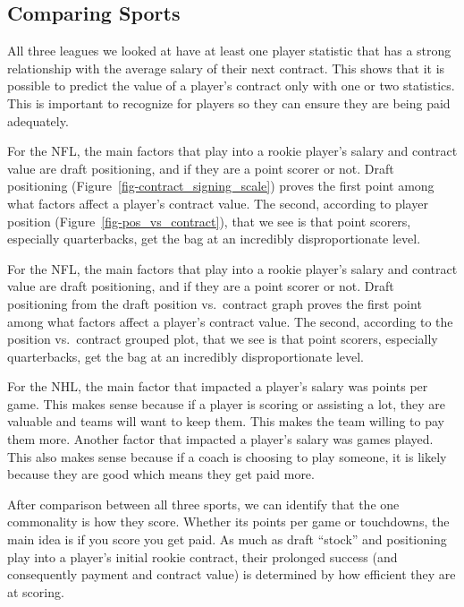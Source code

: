 \documentclass[
  letterpaper,
  DIV=11,
  numbers=noendperiod]{scrartcl}
\begin{document}
\subsection{Comparing Sports}\label{comparing-sports}

All three leagues we looked at have at least one player statistic that
has a strong relationship with the average salary of their next
contract. This shows that it is possible to predict the value of a
player's contract only with one or two statistics. This is important to
recognize for players so they can ensure they are being paid adequately.

For the NFL, the main factors that play into a rookie player's salary
and contract value are draft positioning, and if they are a point scorer
or not. Draft positioning (Figure~\ref{fig-contract_signing_scale})
proves the first point among what factors affect a player's contract
value. The second, according to player position
(Figure~\ref{fig-pos_vs_contract}), that we see is that point scorers,
especially quarterbacks, get the bag at an incredibly disproportionate
level.

For the NFL, the main factors that play into a rookie player's salary
and contract value are draft positioning, and if they are a point scorer
or not. Draft positioning from the draft position vs.~contract graph
proves the first point among what factors affect a player's contract
value. The second, according to the position vs.~contract grouped plot,
that we see is that point scorers, especially quarterbacks, get the bag
at an incredibly disproportionate level.

For the NHL, the main factor that impacted a player's salary was points
per game. This makes sense because if a player is scoring or assisting a
lot, they are valuable and teams will want to keep them. This makes the
team willing to pay them more. Another factor that impacted a player's
salary was games played. This also makes sense because if a coach is
choosing to play someone, it is likely because they are good which means
they get paid more.

After comparison between all three sports, we can identify that the one
commonality is how they score. Whether its points per game or
touchdowns, the main idea is if you score you get paid. As much as draft
``stock'' and positioning play into a player's initial rookie contract,
their prolonged success (and consequently payment and contract value) is
determined by how efficient they are at scoring.
\end{document}

